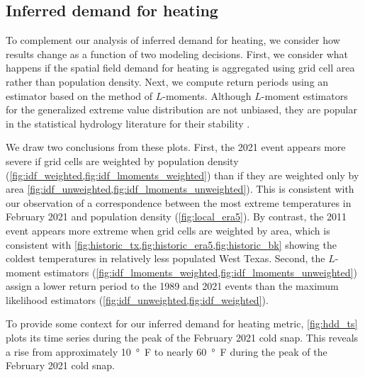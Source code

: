 \documentclass[12pt]{iopart}
\providecommand{\DIFadd}[1]{{\protect\color{blue}\uwave{#1}}} %
\providecommand{\DIFaddbegin}{} %
\providecommand{\DIFaddend}{} %
\newcommand{\DIFaddincludegraphics}[2][]{{\color{blue}\fbox{\DIFOincludegraphics[#1]{#2}}}} %
\DeclareRobustCommand{\DIFaddbegin}{\DIFOaddbegin \let\includegraphics\DIFaddincludegraphics} %
\DeclareRobustCommand{\DIFaddend}{\DIFOaddend \let\includegraphics\DIFOincludegraphics} %
\begin{document}
\subsection{Inferred \DIFaddbegin \DIFadd{per capita }\DIFaddend demand for heating}

To complement our analysis of inferred \DIFaddbegin \DIFadd{per capita }\DIFaddend demand for heating, we consider how results change as a function of two modeling decisions.
First, we consider what happens if the spatial field demand for heating is aggregated using grid cell area rather than population density.
Next, we compute return periods using an estimator based on the method of $L$-moments.
Although $L$-moment estimators for the generalized extreme value distribution are not unbiased, they are popular in the statistical hydrology literature for their stability \cite{hosking_gev:1985,martins_gev:2001,morrison_gev:2002}.

We draw two conclusions from these plots.
First, the 2021 event appears more severe if grid cells are weighted by population density (\cref{fig:idf_weighted,fig:idf_lmoments_weighted}) than if they are weighted only by area \cref{fig:idf_unweighted,fig:idf_lmoments_unweighted}).
This is consistent with our observation of a correspondence between the most extreme temperatures in February 2021 and population density (\cref{fig:local_era5}).
By contrast, the 2011 event appears more extreme when grid cells are weighted by area, which is consistent with \cref{fig:historic_tx,fig:historic_era5,fig:historic_bk} showing the coldest temperatures in relatively less populated West Texas.
Second, the $L$-moment estimators (\cref{fig:idf_lmoments_weighted,fig:idf_lmoments_unweighted}) assign a lower return period to the 1989 and 2021 events than the maximum likelihood estimators (\cref{fig:idf_unweighted,fig:idf_weighted}).

To provide some context for our inferred demand for heating metric, \cref{fig:hdd_ts} plots its time series during the peak of the February 2021 cold snap.
This reveals a rise from approximately \SI{10}{\degree F} to nearly \SI{60}{\degree F} during the peak of the February 2021 cold snap.
\end{document}
